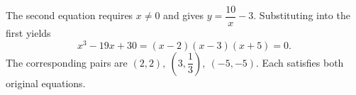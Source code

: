 The second equation requires $x\ne0$ and gives $y=\dfrac{10}{x}-3$. Substituting into the first yields
\[
x^3-19x+30=(x-2)(x-3)(x+5)=0.
\]
The corresponding pairs are $\boxed{(2,2),\ (3,\dfrac{1}{3}),\ (-5,-5)}$. Each satisfies both original equations.
